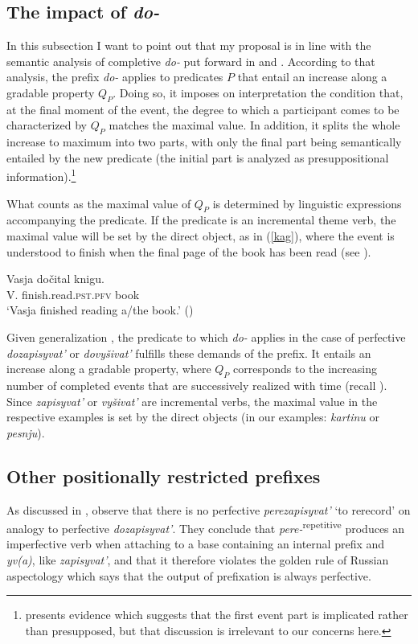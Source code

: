 \documentclass[output=paper,
colorlinks,
citecolor=brown,
newtxmath
]{langscibook}
\begin{document}
\subsection{The impact of \textit{do-}}
In this subsection I want to point out that my proposal is in line with the semantic analysis of completive \textit{do-} put forward in \citet{Kagan2012} and \citet{Kagan2015}. According to that analysis, the prefix \textit{do-} applies to predicates $P$ that entail an increase along a gradable property $Q_P$.
Doing so, it imposes on interpretation the condition that, at the final moment of the event, the degree to which a participant comes to be characterized by $Q_P$ matches the maximal value. In addition, it splits the whole increase to maximum into two parts, with only the final part being semantically entailed by the new predicate (the initial part is analyzed as presuppositional information).\footnote{\citet[200ff.]{Zinova2016} presents evidence which suggests that the first event part is implicated rather than presupposed, but that discussion is irrelevant to our concerns here.}

What counts as the maximal value of $Q_P$ is determined by linguistic expressions accompanying the predicate. If the predicate is an incremental theme verb, the maximal value will be set by the direct object, as in (\ref{kag}), where the event is understood to finish when the final page of the book has been read (see \citealt[71]{Kagan2015}).


\ea\label{kag}
\gll Vasja dočital knigu.\\
V. {finish.read.}\textsc{pst.pfv} book\\
\glt `Vasja finished reading a/the book.' \hfill (\citealt[71]{Kagan2015})
\z

\noindent Given generalization , the predicate to which \textit{do-} applies in the case of perfective \textit{dozapisyvat'} or \textit{dovyšivat'} fulfills these demands of the prefix. It entails an increase along a gradable property, where $Q_P$ corresponds to the increasing number of completed events that are successively realized with time (recall ). Since \textit{zapisyvat'} or \textit{vyšivat'} are incremental verbs, the maximal value in the respective examples is set by the direct objects (in our examples: \textit{kartinu} or \textit{pesnju}).

\subsection{Other positionally restricted prefixes}
As discussed in ,
\citet{Zinova.Filip2015} observe that there is no perfective \textit{perezapisyvat'} `to rerecord' on analogy to perfective \textit{dozapisyvat'}. They conclude that \textit{pere-}\textsuperscript{repetitive} produces an imperfective verb when attaching to a base containing an internal prefix and \textit{yv(a)}, like \textit{zapisyvat'}, and that it therefore violates the golden rule of Russian aspectology which says that the output of prefixation is always perfective.
\end{document}
